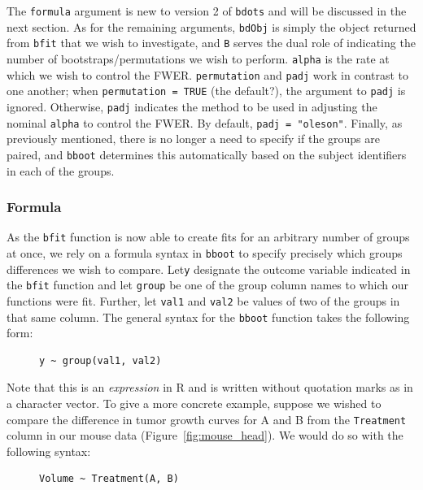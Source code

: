 \documentclass{article}
\newcommand{\xt}{\texttt}%
\begin{document}
The \xt{formula} argument is new to version 2 of \xt{bdots} and will be discussed in the next section. As for the remaining arguments, \xt{bdObj} is simply the object returned from \xt{bfit} that we wish to investigate, and \xt{B} serves the dual role of indicating the number of bootstraps/permutations we wish to perform. \xt{alpha} is the rate at which we wish to control the FWER. \xt{permutation} and \xt{padj} work in contrast to one another; when \xt{permutation = TRUE} (the default?), the argument to \xt{padj} is ignored. Otherwise, \xt{padj} indicates the method to be used in adjusting the nominal \xt{alpha} to control the FWER. By default, \xt{padj = "oleson"}. Finally, as previously mentioned, there is no longer a need to specify if the groups are paired, and \xt{bboot} determines this automatically based on the subject identifiers in each of the groups.


\subsubsection{Formula}

As the \xt{bfit} function is now able to create fits for an arbitrary number of groups at once, we rely on a formula syntax in \xt{bboot} to specify precisely which groups differences we wish to compare. Let\xt{y} designate the outcome variable indicated in the \xt{bfit} function and let \xt{group} be one of the group column names to which our functions were fit. Further, let \xt{val1} and \xt{val2} be values of two of the groups in that same column. The general syntax for the \xt{bboot} function takes the following form:

\begin{singlespace}
\begin{figure}[H]
\centering
\begin{BVerbatim}
y ~ group(val1, val2)
\end{BVerbatim}
\end{figure}
\end{singlespace}

Note that this is an \textit{expression} in R and is written without quotation marks as in a character vector. To give a more concrete example, suppose we wished to compare the difference in tumor growth curves for A and B from the \xt{Treatment} column in our mouse data (Figure~\ref{fig:mouse_head}). We would do so with the following syntax:

\begin{singlespace}
\begin{figure}[H]
\centering
\begin{BVerbatim}
Volume ~ Treatment(A, B)
\end{BVerbatim}
\end{figure}
\end{singlespace}
\end{document}
